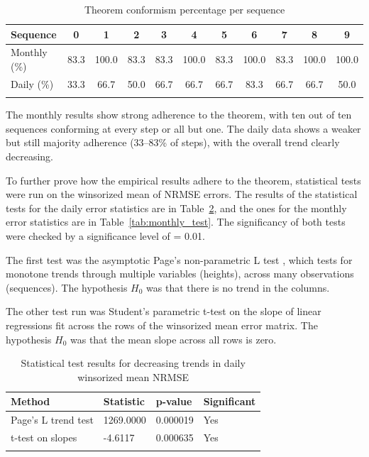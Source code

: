 \documentclass[sn-basic,Numbered,iicol]{sn-jnl}
\theoremstyle{thmstyleone}%
\theoremstyle{thmstyletwo}%
\theoremstyle{thmstylethree}%
\begin{document}
\begin{table}[h]
\caption{Theorem conformism percentage per sequence}\label{tab:conformism}
\begin{tabular*}{\textwidth}{@{\extracolsep\fill}lcccccccccc}
\toprule
Sequence & 0 & 1 & 2 & 3 & 4 & 5 & 6 & 7 & 8 & 9 \\
\midrule
Monthly (\%) & 83.3 & 100.0 & 83.3 & 83.3 & 100.0 & 83.3 & 100.0 & 83.3 & 100.0 & 100.0 \\
Daily (\%) & 33.3 & 66.7 & 50.0 & 66.7 & 66.7 & 66.7 & 83.3 & 66.7 & 66.7 & 50.0 \\
\botrule
\end{tabular*}
\end{table}

The monthly results show strong adherence to the theorem, with ten out of ten sequences conforming at every step or all but one. The daily data shows a weaker but still majority adherence (33--83\% of steps), with the overall trend clearly decreasing.

To further prove how the empirical results adhere to the theorem, statistical tests were run on the winsorized mean of NRMSE errors. The results of the statistical tests for the daily error statistics are in Table~\ref{tab:daily_test}, and the ones for the monthly error statistics are in Table~\ref{tab:monthly_test}. The significancy of both tests were checked by a significance level of \alpha = 0.01.

The first test was the asymptotic Page's non-parametric L test \cite{pageltest}, which tests for monotone trends through multiple variables (heights), across many observations (sequences). The hypothesis $H_0$ was that there is no trend in the columns.

The other test run was Student's parametric t-test on the slope of linear regressions fit across the rows of the winsorized mean error matrix. The hypothesis $H_0$ was that the mean slope across all rows is zero.

\begin{table}[h]
\caption{Statistical test results for decreasing trends in daily winsorized mean NRMSE}\label{tab:daily_test}
\begin{tabular}{@{}llll@{}}
\toprule
Method & Statistic & p-value & Significant \\
\midrule
Page's L trend test & 1269.0000 & 0.000019 & Yes \\
t-test on slopes & -4.6117 & 0.000635 & Yes \\
\botrule
\end{tabular}
\end{table}
\end{document}
